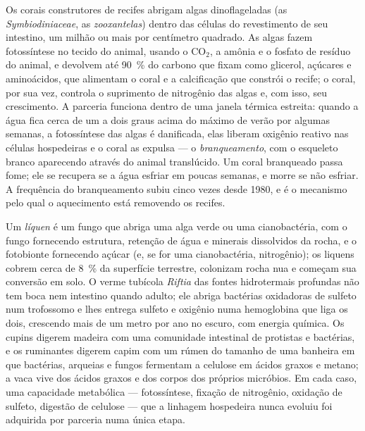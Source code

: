 \begin{definition}\label{def:b3:microbiomes:coral}
Os corais construtores de recifes abrigam algas dinoflageladas (as
\emph{Symbiodiniaceae}, as \emph{zooxantelas}) dentro das células do
revestimento de seu intestino, um milhão ou mais por centímetro
quadrado. As algas fazem fotossíntese no tecido do animal, usando o
CO$_{2}$, a amônia e o fosfato de resíduo do animal, e devolvem até
\qty{90}{\%} do carbono que fixam como glicerol, açúcares e
aminoácidos, que alimentam o coral e a calcificação que constrói o
recife; o coral, por sua vez, controla o suprimento de nitrogênio das
algas e, com isso, seu crescimento. A parceria funciona dentro de uma
janela térmica estreita: quando a água fica cerca de um a dois graus
acima do máximo de verão por algumas semanas, a fotossíntese das algas
é danificada, elas liberam oxigênio reativo nas células hospedeiras e o
coral as expulsa --- o \emph{branqueamento}, com o esqueleto branco
aparecendo através do animal translúcido. Um coral branqueado passa
fome; ele se recupera se a água esfriar em poucas semanas, e morre se
não esfriar. A frequência do branqueamento subiu cinco vezes desde
1980, e é o mecanismo pelo qual o aquecimento está removendo os
recifes.
\end{definition}

\begin{example}\label{ex:b3:microbiomes:habitats}
Um \emph{líquen} é um fungo que abriga uma alga verde ou uma
cianobactéria, com o fungo fornecendo estrutura, retenção de água e
minerais dissolvidos da rocha, e o fotobionte fornecendo açúcar (e, se
for uma cianobactéria, nitrogênio); os liquens cobrem cerca de
\qty{8}{\%} da superfície terrestre, colonizam rocha nua e começam sua
conversão em solo. O verme tubícola \emph{Riftia} das fontes
hidrotermais profundas não tem boca nem intestino quando adulto; ele
abriga bactérias oxidadoras de sulfeto num trofossomo e lhes entrega
sulfeto e oxigênio numa hemoglobina que liga os dois, crescendo mais de
um metro por ano no escuro, com energia química. Os cupins digerem
madeira com uma comunidade intestinal de protistas e bactérias, e os
ruminantes digerem capim com um rúmen do tamanho de uma banheira em que
bactérias, arqueias e fungos fermentam a celulose em ácidos graxos e
metano; a vaca vive dos ácidos graxos e dos corpos dos próprios
micróbios. Em cada caso, uma capacidade metabólica --- fotossíntese,
fixação de nitrogênio, oxidação de sulfeto, digestão de celulose --- que
a linhagem hospedeira nunca evoluiu foi adquirida por parceria numa
única etapa.
\end{example}

